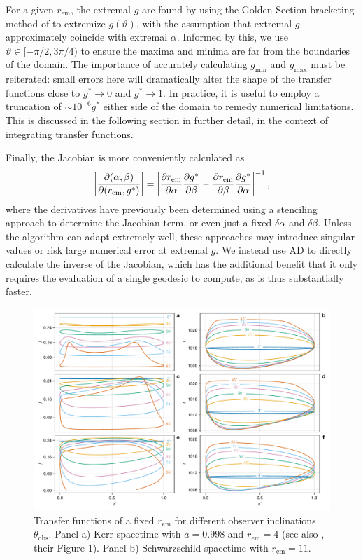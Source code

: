 For a given $r_\text{em}$, the extremal $g$ are found by using the Golden-Section bracketing method of \cite{optimize.jl} to extremize $g(\vartheta)$, with the assumption that extremal $g$ approximately coincide with extremal $\alpha$. Informed by this, we use $\vartheta \in [ -\pi/2, 3\pi/4 )$ to ensure the maxima and minima are far from the boundaries of the domain. The importance of accurately calculating $g_\text{min}$ and $g_\text{max}$ must be reiterated: small errors here will dramatically alter the shape of the transfer functions close to $g^\ast \rightarrow 0$ and $g^\ast \rightarrow 1$. In practice, it is useful to employ a truncation of $\sim 10^{-6}g^\ast$ either side of the 
domain to remedy numerical limitations. This is discussed in the following section in further detail, in the context of integrating transfer functions.

Finally, the Jacobian is more conveniently calculated as
\begin{equation}
    \left\lvert 
    \frac{\partial (\alpha, \beta)}{\partial (r_\text{em}, g^\ast)} 
    \right\rvert
    =
    \left\lvert
    \frac{\partial r_\text{em}}{\partial \alpha}\frac{\partial g^\ast}{\partial \beta}
    -
    \frac{\partial r_\text{em}}{\partial \beta}\frac{\partial g^\ast}{\partial \alpha}
    \right\rvert^{-1},
\end{equation}
where the derivatives have previously been determined using a stenciling approach to determine the Jacobian term, or even just a fixed $\delta \alpha$ and $\delta \beta$. Unless the algorithm can adapt extremely well, these approaches may introduce singular values or risk large numerical error at extremal $g$. We instead use AD to directly calculate the inverse of the Jacobian, which has the additional benefit that it only requires the evaluation of a single geodesic to compute, as is thus substantially faster.


\begin{figure}
    \centering
    \includegraphics[width=0.95\linewidth]{figures/transfer-functions.plots.pdf}
    \caption{Transfer functions of a fixed $r_\text{em}$ for different observer inclinations $\theta_\text{obs}$. Panel a) Kerr spacetime with $a=0.998$ and $r_\text{em} = 4$ (see also \citealp{bambi_testing_2017}, their Figure 1). Panel b) Schwarzschild spacetime with $r_\text{em} = 11$.}
    \label{fig:transfer-functions}
\end{figure}

